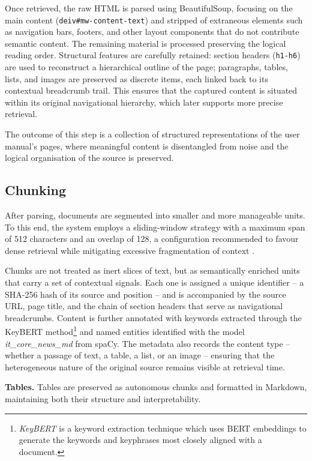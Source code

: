 \begin{spacing}{1.5}
Once retrieved, the raw HTML is parsed using BeautifulSoup, focusing on the main content (\texttt{deiv\#mw-content-text}) and stripped of extraneous elements such as navigation bars, footers, and other layout components that do not contribute semantic content. The remaining material is processed preserving the logical reading order. Structural features are carefully retained: section headers (\texttt{h1-h6}) are used to reconstruct a hierarchical outline of the page; paragraphs, tables, lists, and images are preserved as discrete items, each linked back to its contextual breadcrumb trail. This ensures that the captured content is situated within its original navigational hierarchy, which later supports more precise retrieval.

The outcome of this step is a collection of structured representations of the user manual’s pages, where meaningful content is disentangled from noise and the logical organisation of the source is preserved.


\subsection{Chunking}
After parsing, documents are segmented into smaller and more manageable units. To this end, the system employs a sliding-window strategy with a maximum span of 512 characters and an overlap of 128, a configuration recommended to favour dense retrieval while mitigating excessive fragmentation of context \citep{wang_searching_2024}.

Chunks are not treated as inert slices of text, but as semantically enriched units that carry a set of contextual signals. Each one is assigned a unique identifier -- a SHA-256 hash of its source and position -- and is accompanied by the source URL, page title, and the chain of section headers that serve as navigational breadcrumbs. Content is further annotated with keywords extracted through the KeyBERT method\footnote{\textit{KeyBERT} is a keyword extraction technique which uses BERT embeddings to generate the keywords and keyphrases most closely aligned with a document.} and named entities identified with the model \textit{it\_core\_news\_md} from spaCy. The metadata also records the content type -- whether a passage of text, a table, a list, or an image -- ensuring that the heterogeneous nature of the original source remains visible at retrieval time.

\textbf{Tables. }Tables are preserved as autonomous chunks and formatted in Markdown, maintaining both their structure and interpretability. 


\end{spacing}
